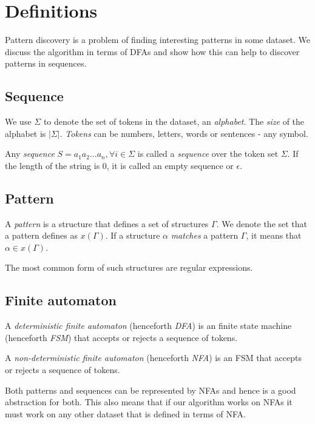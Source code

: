 \chapter{Definitions}

Pattern discovery is a problem of finding interesting patterns in
some dataset. We discuss the algorithm in terms of DFAs and
show how this can help to discover patterns in sequences.


\section{Sequence}

We use $\Sigma$ to denote the set of tokens in the dataset, an \emph{alphabet}. 
The \emph{size} of the alphabet is $|\Sigma|$. \emph{Tokens} can be numbers, 
letters, words or sentences - any symbol.

Any \emph{sequence} $S=a_1 a_2 ... a_n, \forall i \in \Sigma$ is called a \emph{sequence} 
over the token set $\Sigma$. If the length of the
string is $0$, it is called an empty sequence or $\epsilon$.

\section{Pattern}

A \emph{pattern} is a structure that defines a set of structures $\Gamma$.
We denote the set that a pattern defines as $x(\Gamma)$.
If a structure $\alpha$ \emph{matches} a pattern $\Gamma$, it means that
$\alpha \in x(\Gamma)$.

The most common form of such structures are regular expressions. 

\section{Finite automaton}

A \emph{deterministic finite automaton} (henceforth \emph{DFA}) is an 
finite state machine (henceforth \emph{FSM}) that accepts or rejects
a sequence of tokens. 

A \emph{non-deterministic finite automaton} (henceforth \emph{NFA}) is an 
FSM that accepts or rejects a sequence of tokens. 

Both patterns and sequences can be represented by NFAs and hence
is a good abstraction for both. This also means that if our algorithm
works on NFAs it must work on any other dataset that is defined in 
terms of NFA.

